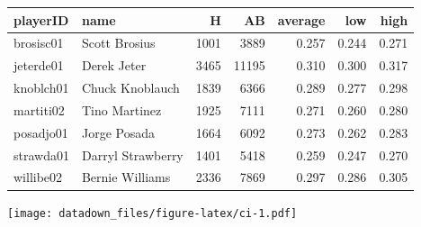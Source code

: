 \documentclass[
]{book}
\newenvironment{Shaded}{\begin{snugshade}}{\end{snugshade}}
\newcommand{\CommentTok}[1]{\textcolor[rgb]{0.56,0.35,0.01}{\textit{#1}}}
\newcommand{\DataTypeTok}[1]{\textcolor[rgb]{0.13,0.29,0.53}{#1}}
\newcommand{\DecValTok}[1]{\textcolor[rgb]{0.00,0.00,0.81}{#1}}
\newcommand{\KeywordTok}[1]{\textcolor[rgb]{0.13,0.29,0.53}{\textbf{#1}}}
\newcommand{\NormalTok}[1]{#1}
\newcommand{\OperatorTok}[1]{\textcolor[rgb]{0.81,0.36,0.00}{\textbf{#1}}}
\newcommand{\StringTok}[1]{\textcolor[rgb]{0.31,0.60,0.02}{#1}}
\begin{document}
\begin{tabular}{l|l|r|r|r|r|r}
\hline
playerID & name & H & AB & average & low & high\\
\hline
brosisc01 & Scott Brosius & 1001 & 3889 & 0.257 & 0.244 & 0.271\\
\hline
jeterde01 & Derek Jeter & 3465 & 11195 & 0.310 & 0.300 & 0.317\\
\hline
knoblch01 & Chuck Knoblauch & 1839 & 6366 & 0.289 & 0.277 & 0.298\\
\hline
martiti02 & Tino Martinez & 1925 & 7111 & 0.271 & 0.260 & 0.280\\
\hline
posadjo01 & Jorge Posada & 1664 & 6092 & 0.273 & 0.262 & 0.283\\
\hline
strawda01 & Darryl Strawberry & 1401 & 5418 & 0.259 & 0.247 & 0.270\\
\hline
willibe02 & Bernie Williams & 2336 & 7869 & 0.297 & 0.286 & 0.305\\
\hline
\end{tabular}

\begin{Shaded}
\end{Shaded}

\texttt{[image: datadown\_files/figure-latex/ci-1.pdf]}
\end{document}
